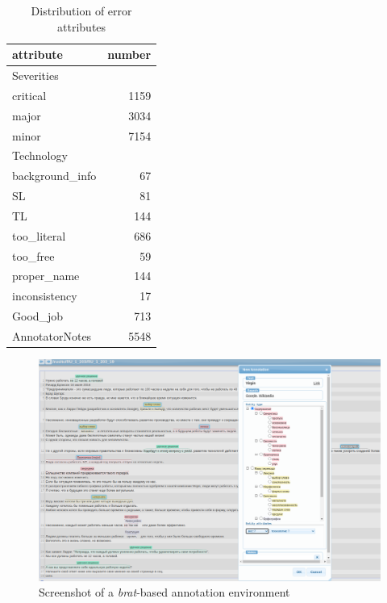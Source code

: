 \begin{multicols}{2}
\begin{table}[H]
	\centering
	\begin{tabular}{lr}
		\toprule
		attribute & number \\
		\midrule
		Severities      &    \\
		\hspace{1em}critical         & 1159 \\
		\hspace{1em}major            & 3034 \\
		\hspace{1em}minor            & 7154  \\
		\midrule
		Technology       &      \\
		\hspace{1em}background\_info & 67   \\
		\hspace{1em}SL               & 81   \\
		\hspace{1em}TL               & 144  \\
		\hspace{1em}too\_literal     & 686  \\
		\hspace{1em}too\_free        & 59   \\
		\hspace{1em}proper\_name     & 144  \\
		\hspace{1em}inconsistency    & 17   \\
		Good\_job        & 713  \\
		\midrule
		AnnotatorNotes   & 5548 \\
		\bottomrule
	\end{tabular}
\caption{\label{tab:attstats}Distribution of error attributes}
\end{table}

\end{multicols}

\begin{figure}
\includegraphics[width=\textwidth]{figures/brat}
\caption{\label{fig:brat}Screenshot of a \textit{brat}-based annotation environment}
\end{figure}

